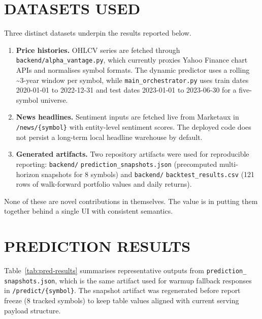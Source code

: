 \documentclass[12pt,a4paper]{report}
\numberwithin{equation}{chapter}
\begin{document}
\section{DATASETS USED}

Three distinct datasets underpin the results reported below.

\begin{enumerate}
  \item \textbf{Price histories.} OHLCV series are fetched through \texttt{backend/alpha\_vantage.py}, which currently proxies Yahoo Finance chart APIs and normalises symbol formats. The dynamic predictor uses a rolling \textasciitilde3-year window per symbol, while \texttt{main\_orchestrator.py} uses train dates 2020-01-01 to 2022-12-31 and test dates 2023-01-01 to 2023-06-30 for a five-symbol universe.
  \item \textbf{News headlines.} Sentiment inputs are fetched live from Marketaux in \texttt{/news/\{symbol\}} with entity-level sentiment scores. The deployed code does not persist a long-term local headline warehouse by default.
  \item \textbf{Generated artifacts.} Two repository artifacts were used for reproducible reporting: \texttt{backend/} \texttt{prediction\_snapshots.json} (precomputed multi-horizon snapshots for 8 symbols) and \texttt{backend/} \texttt{backtest\_results.csv} (121 rows of walk-forward portfolio values and daily returns).
\end{enumerate}

None of these are novel contributions in themselves. The value is in putting them together behind a single UI with consistent semantics.

\section{PREDICTION RESULTS}

Table~\ref{tab:pred-results} summarises representative outputs from \texttt{prediction\_} \texttt{snapshots.json}, which is the same artifact used for warmup fallback responses in \texttt{/predict/\{symbol\}}.
The snapshot artifact was regenerated before report freeze (8 tracked symbols) to keep table values aligned with current serving payload structure.
\end{document}
